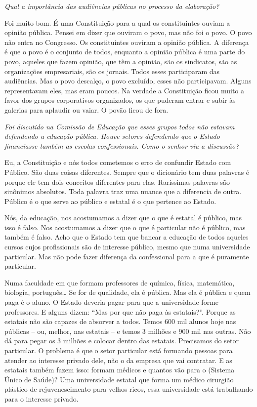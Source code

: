 \noindent\emph{Qual a importância das audiências públicas no processo da
elaboração?}

Foi muito bom. É uma Constituição para a qual os
constituintes ouviam a opinião pública. Pensei em dizer que ouviram o
povo, mas não foi o povo. O povo não entra no Congresso. Os
constituintes ouviram a opinião pública. A diferença é que o povo é o
conjunto de todos, enquanto a opinião pública é uma parte do povo,
aqueles que fazem opinião, que têm a opinião, são os sindicatos, são as
organizações empresariais, são os jornais. Todos esses participaram das
audiências. Mas o povo descalço, o povo excluído, esses não
participavam. Alguns representavam eles, mas eram poucos. Na verdade a
Constituição ficou muito a favor dos grupos corporativos organizados, os
que puderam entrar e subir às galerias para aplaudir ou vaiar. O povão
ficou de fora.

\medskip

\noindent\emph{Foi discutido na Comissão de Educação que esses grupos todos não
estavam defendendo a educação pública. Houve setores defendendo que o
Estado financiasse também as escolas confessionais. Como o senhor viu a
discussão?}

Eu, a Constituição e nós todos cometemos o erro de
confundir Estado com Público. São duas coisas diferentes. Sempre que o
dicionário tem duas palavras é porque ele tem dois conceitos diferentes
para elas. Raríssimas palavras são sinônimos absolutos. Toda palavra
traz uma nuance que a diferencia de outra. Público é o que serve ao
público e estatal é o que pertence ao Estado.

Nós, da educação, nos acostumamos a dizer que o que é estatal é público,
mas isso é falso. Nos acostumamos a dizer que o que é particular não é
público, mas também é falso. Acho que o Estado tem que bancar a educação
de todos aqueles cursos cujos profissionais são de interesse público,
mesmo que numa universidade particular. Mas não pode fazer diferença da
confessional para a que é puramente particular.

Numa faculdade em que formam professores de química, física, matemática,
biologia, português\ldots{} Se for de qualidade, ela é pública. Mas ela é
pública e quem paga é o aluno. O Estado deveria pagar para que a
universidade forme professores. E alguns dizem: ``Mas por que não paga
às estatais?''. Porque as estatais não são capazes de absorver a todos.
Temos 600 mil alunos hoje nas públicas -- ou, melhor, nas estatais -- e
temos 3 milhões e 900 mil nas outras. Não dá para pegar os 3 milhões e
colocar dentro das estatais. Precisamos do setor particular. O problema
é que o setor particular está formando pessoas para atender ao interesse
privado dele, não o da empresa que vai contratar. E as estatais também
fazem isso: formam médicos e quantos vão para o  (Sistema Único de
Saúde)? Uma universidade estatal que forma um médico cirurgião plástico
de rejuvenescimento para velhos ricos, essa universidade está
trabalhando para o interesse privado.


